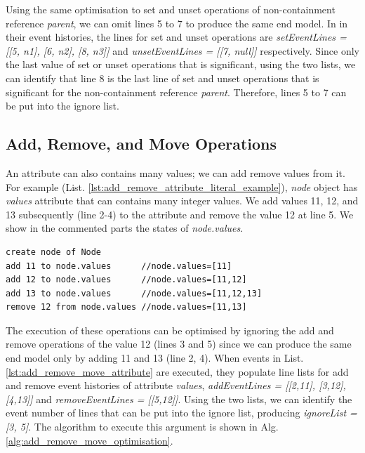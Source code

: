 \documentclass{llncs}
\begin{document}
Using the same optimisation to set and unset operations of non-containment reference \emph{parent}, we can omit lines 5 to 7 to produce the same end model. In in their event histories, the lines for set and unset operations are \emph{setEventLines = [[5, n1], [6, n2], [8, n3]]} and \emph{unsetEventLines = [[7, null]]} respectively. Since only the last value of set or unset operations that is significant, using the two lists, we can identify that line 8 is the last line of set and unset operations that is significant for the non-containment reference \emph{parent}. Therefore, lines 5 to 7 can be put into the ignore list.

\subsection{Add, Remove, and Move Operations}
\label{subsec:add_remove_and_move_operations}
An attribute can also contains many values; we can add remove values from it. For example (List. \ref{lst:add_remove_attribute_literal_example}), \emph{node} object has \emph{values} attribute that can contains many integer values. We add values 11, 12, and 13 subsequently (line 2-4) to the attribute and remove the value 12 at line 5. We show in the commented parts the states of \emph{node.values}.  

\begin{lstlisting}[style=eol,caption={Example of CBP representation of attribute \emph{values}'s add and remove operations.},label=lst:add_remove_move_attribute]
create node of Node
add 11 to node.values      //node.values=[11] 
add 12 to node.values      //node.values=[11,12] 
add 13 to node.values      //node.values=[11,12,13] 
remove 12 from node.values //node.values=[11,13] 
\end{lstlisting}

The execution of these operations can be optimised by ignoring the add and remove operations of the value 12 (lines 3 and 5) since we can produce the same end model only by adding 11 and 13 (line 2, 4). When events in List. \ref{lst:add_remove_move_attribute} are executed, they populate line lists for add and remove event histories of attribute \emph{values}, \emph{addEventLines = [[2,11], [3,12], [4,13]]} and \emph{removeEventLines = [[5,12]]}. Using the two lists, we can identify the event number of lines that can be put into the ignore list, producing \emph{ignoreList = [3, 5]}. The algorithm to execute this argument is shown in Alg. \ref{alg:add_remove_move_optimisation}.
\end{document}

